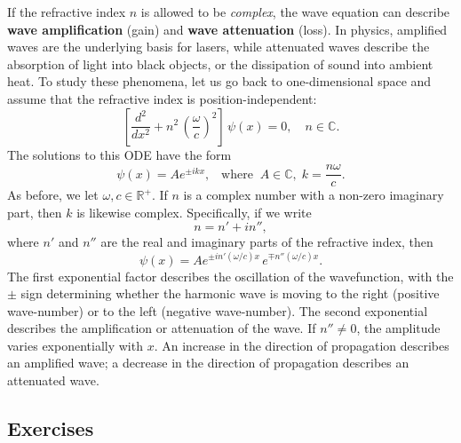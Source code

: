 \documentclass[10pt,a4paper]{article}
\begin{document}
If the refractive index $n$ is allowed to be \emph{complex}, the wave
equation can describe \textbf{wave amplification} (gain) and
\textbf{wave attenuation} (loss). In physics, amplified waves are the
underlying basis for lasers, while attenuated waves describe the
absorption of light into black objects, or the dissipation of sound
into ambient heat. To study these phenomena, let us go back to
one-dimensional space and assume that the refractive index is
position-independent:
\begin{equation}
\left[\frac{d^2}{d x^2} + n^2\, \left(\frac{\omega}{c}\right)^2\right] \, \psi(x) = 0, \quad n \in \mathbb{C}.
\end{equation}
The solutions to this ODE have the form
\begin{equation}
\psi(x) = A e^{\pm ikx},\;\;\;\mathrm{where}\;\; A \in \mathbb{C}, \;k = \frac{n\omega}{c}.
\label{traveling}
\end{equation}
As before, we let $\omega, c \in \mathbb{R}^+$. If $n$ is a complex
number with a non-zero imaginary part, then $k$ is likewise complex.
Specifically, if we write
\begin{equation}
n = n' + i n'',
\end{equation}
where $n'$ and $n''$ are the real and imaginary parts of the
refractive index, then
\begin{equation}
\psi(x) = A e^{\pm in'(\omega/c)x}\, e^{\mp n''(\omega/c)x}.
\end{equation}
The first exponential factor describes the oscillation of the
wavefunction, with the $\pm$ sign determining whether the harmonic
wave is moving to the right (positive wave-number) or to the left
(negative wave-number). The second exponential describes the
amplification or attenuation of the wave. If $n'' \ne 0$, the
amplitude varies exponentially with $x$. An increase in the direction
of propagation describes an amplified wave; a decrease in the direction
of propagation describes an attenuated wave.

\subsection{Exercises}
\label{exercises}
\end{document}
